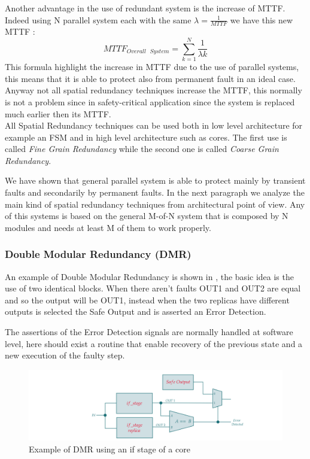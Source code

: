 {{{		    Another advantage in the use of redundant system is the increase of MTTF. Indeed using N parallel system each with the same $\lambda=\frac{1}{MTTF}$ we have this new MTTF :
		    \begin{equation}
		         MTTF_{Overall\,\,\,\,System} = \sum_{k=1}^{N} \dfrac{1}{\lambda k}
		    \end{equation} 
		    This formula highlight the increase in MTTF due to the use of parallel systems, this means that it is able to protect also from permanent fault in an ideal case. Anyway not all spatial redundancy techniques increase the MTTF, this normally is not a problem since in safety-critical application since the system is replaced much earlier then its MTTF. \\
		    
		    All Spatial Redundancy techniques can be used both in low level architecture for example an FSM and in high level architecture such as cores. The first use is called \textit{Fine Grain Redundancy} while the second one is called \textit{Coarse Grain Redundancy}.  
		   
		    We have shown that general parallel system is able to protect mainly by transient faults and secondarily by permanent faults. In the next paragraph we analyze the main kind of spatial redundancy techniques from architectural point of view. Any of this systems is based on the general M-of-N system that is composed by N modules and needs at least M of them to work properly.
		    
		    \subsubsection{Double Modular Redundancy (DMR)}{
		        An example of Double Modular Redundancy is shown in , the basic idea is the use of two identical blocks. When there aren't faults OUT1 and OUT2 are equal and so the output will be OUT1, instead when the two replicas have different outputs is selected the Safe Output and is asserted an Error Detection. 
		        
		        The assertions of the Error Detection signals are normally handled at software level, here should exist a routine that enable recovery of the previous state and a new execution of the faulty step.
		        
		        \begin{figure}[H]
        			\centering
        			\includegraphics[scale=0.2,center]{./images/DMR1.png}
        			\caption{Example of DMR using an if stage of a core}
        			\label{fig:DMR1}
        		\end{figure} 
        		
}}}}
